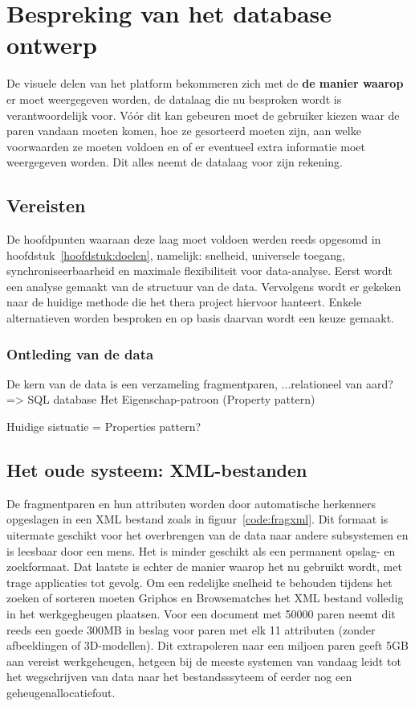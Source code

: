 \chapter{Bespreking van het database ontwerp}
\label{hoofdstuk:database}
De visuele delen van het platform bekommeren zich met de \textbf{de manier waarop} er moet weergegeven worden, de datalaag die nu besproken wordt is verantwoordelijk voor. V\'o\'or dit kan gebeuren moet de gebruiker kiezen waar de paren vandaan moeten komen, hoe ze gesorteerd moeten zijn, aan welke voorwaarden ze moeten voldoen en of er eventueel extra informatie moet weergegeven worden. Dit alles neemt de datalaag voor zijn rekening.

\section{Vereisten}
De hoofdpunten waaraan deze laag moet voldoen werden reeds opgesomd in hoofdstuk~\ref{hoofdstuk:doelen}, namelijk: snelheid, universele toegang, synchroniseerbaarheid en maximale flexibiliteit voor data-analyse. Eerst wordt een analyse gemaakt van de structuur van de data. Vervolgens wordt er gekeken naar de huidige methode die het thera project hiervoor hanteert. Enkele alternatieven worden besproken en op basis daarvan wordt een keuze gemaakt.

\subsection{Ontleding van de data}
De kern van de data is een verzameling fragmentparen,
...relationeel van aard? => SQL database
Het Eigenschap-patroon (Property pattern)

Huidige sistuatie = Properties pattern? %

\section{Het oude systeem: XML-bestanden}
De fragmentparen en hun attributen worden door automatische herkenners opgeslagen in een XML bestand zoals in figuur~\ref{code:fragxml}. Dit formaat is uitermate geschikt voor het overbrengen van de data naar andere subsystemen en is leesbaar door een mens. Het is minder geschikt als een permanent opslag- en zoekformaat. Dat laatste is echter de manier waarop het nu gebruikt wordt, met trage applicaties tot gevolg. Om een redelijke snelheid te behouden tijdens het zoeken of sorteren moeten Griphos en Browsematches het XML bestand volledig in het werkgegheugen plaatsen. Voor een document met 50000 paren neemt dit reeds een goede 300MB in beslag voor paren met elk 11 attributen (zonder afbeeldingen of 3D-modellen). Dit extrapoleren naar een miljoen paren geeft 5GB aan vereist werkgeheugen, hetgeen bij de meeste systemen van vandaag leidt tot het wegschrijven van data naar het bestandsssyteem of eerder nog een geheugenallocatiefout.\\

